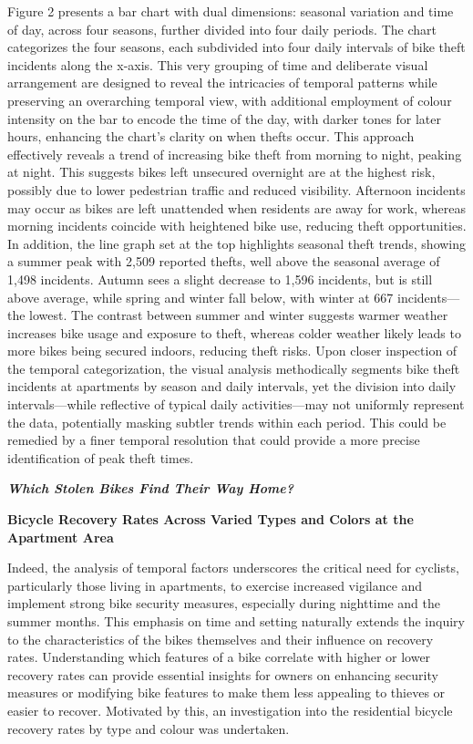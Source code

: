 \documentclass[
  11pt,
]{article}
\begin{document}
\indent Figure 2 presents a bar chart with dual dimensions: seasonal
variation and time of day, across four seasons, further divided into
four daily periods. The chart categorizes the four seasons, each
subdivided into four daily intervals of bike theft incidents along the
x-axis. This very grouping of time and deliberate visual arrangement are
designed to reveal the intricacies of temporal patterns while preserving
an overarching temporal view, with additional employment of colour
intensity on the bar to encode the time of the day, with darker tones
for later hours, enhancing the chart's clarity on when thefts occur.
This approach effectively reveals a trend of increasing bike theft from
morning to night, peaking at night. This suggests bikes left unsecured
overnight are at the highest risk, possibly due to lower pedestrian
traffic and reduced visibility. Afternoon incidents may occur as bikes
are left unattended when residents are away for work, whereas morning
incidents coincide with heightened bike use, reducing theft
opportunities. In addition, the line graph set at the top highlights
seasonal theft trends, showing a summer peak with 2,509 reported thefts,
well above the seasonal average of 1,498 incidents. Autumn sees a slight
decrease to 1,596 incidents, but is still above average, while spring
and winter fall below, with winter at 667 incidents---the lowest. The
contrast between summer and winter suggests warmer weather increases
bike usage and exposure to theft, whereas colder weather likely leads to
more bikes being secured indoors, reducing theft risks. Upon closer
inspection of the temporal categorization, the visual analysis
methodically segments bike theft incidents at apartments by season and
daily intervals, yet the division into daily intervals---while
reflective of typical daily activities---may not uniformly represent the
data, potentially masking subtler trends within each period. This could
be remedied by a finer temporal resolution that could provide a more
precise identification of peak theft times.

\textit{\textbf{{Which Stolen Bikes Find Their Way Home? }}}

\textbf{\footnotesize{Bicycle Recovery Rates Across Varied Types and Colors at the Apartment Area}}

\indent Indeed, the analysis of temporal factors underscores the
critical need for cyclists, particularly those living in apartments, to
exercise increased vigilance and implement strong bike security
measures, especially during nighttime and the summer months. This
emphasis on time and setting naturally extends the inquiry to the
characteristics of the bikes themselves and their influence on recovery
rates. Understanding which features of a bike correlate with higher or
lower recovery rates can provide essential insights for owners on
enhancing security measures or modifying bike features to make them less
appealing to thieves or easier to recover. Motivated by this, an
investigation into the residential bicycle recovery rates by type and
colour was undertaken.
\end{document}
